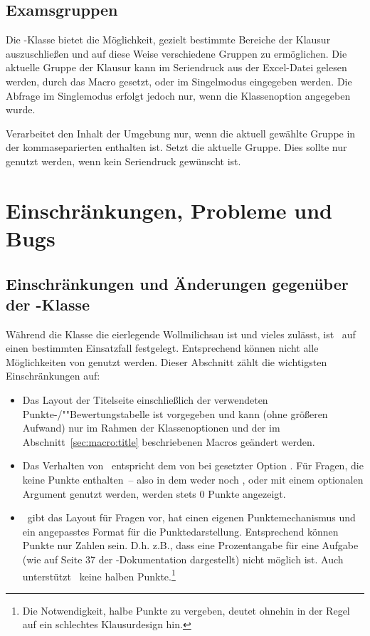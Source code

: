 \documentclass[
load=osgexam,
babel=ngerman
]{skdoc}
\begin{document}
\subsection{Examsgruppen}
\label{sec:groups}
Die \thepkg-Klasse bietet die Möglichkeit, gezielt bestimmte Bereiche der
Klausur auszuschließen und auf diese Weise verschiedene Gruppen zu ermöglichen.
Die aktuelle Gruppe der Klausur kann im Seriendruck aus der Excel-Datei gelesen
werden, durch das Macro  gesetzt, oder im Singelmodus eingegeben
werden.
Die Abfrage im Singlemodus erfolgt jedoch nur, wenn die Klassenoption
 angegeben wurde.

 Verarbeitet den Inhalt der
Umgebung nur, wenn die aktuell gewählte Gruppe in der kommaseparierten  enthalten ist.
\DescribeMacro{} Setzt die aktuelle Gruppe. Dies sollte
nur genutzt werden, wenn kein Seriendruck gewünscht ist.

\section{Einschränkungen, Probleme und Bugs}
\subsection{Einschränkungen und Änderungen gegenüber der -Klasse}
Während die Klasse  die eierlegende Wollmilichsau ist und vieles zulässt, ist \thepkg\ auf einen bestimmten
Einsatzfall festgelegt. Entsprechend können nicht alle Möglichkeiten von  genutzt werden.
Dieser Abschnitt zählt die wichtigsten Einschränkungen auf:
\begin{itemize}
   \item Das Layout der Titelseite einschließlich der verwendeten \mbox{Punkte-/}""Bewertungstabelle ist vorgegeben und kann (ohne größeren
    Aufwand) nur im Rahmen der Klassenoptionen und der im Abschnitt~\ref{sec:macro:title} beschriebenen Macros geändert werden.
 
    
  \item Das Verhalten von \thepkg\ entspricht dem von  bei gesetzter Option . Für Fragen, die keine
    Punkte enthalten~-- also in dem weder  noch ,  oder 
    mit einem optionalen Argument genutzt werden, werden stets 0 Punkte angezeigt.
    
  \item \thepkg\ gibt das Layout für Fragen vor, hat einen eigenen Punktemechanismus und ein angepasstes Format für
    die Punktedarstellung. Entsprechend können Punkte nur Zahlen sein. D.\;h. z.\;B., dass eine Prozentangabe für eine
    Aufgabe (wie  auf  Seite 37 der -Dokumentation dargestellt) nicht möglich ist. Auch unterstützt \thepkg\
    keine halben Punkte.\footnote{Die Notwendigkeit, halbe Punkte zu vergeben, deutet ohnehin in der Regel auf ein
      schlechtes Klausurdesign hin.}
\end{itemize}
\end{document}
